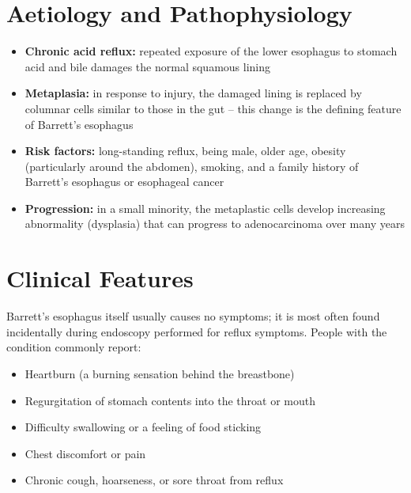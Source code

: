 \section*{Aetiology and Pathophysiology}
\begin{itemize}
    \item \textbf{Chronic acid reflux:} repeated exposure of the lower esophagus to stomach acid and bile damages the normal squamous lining
    \item \textbf{Metaplasia:} in response to injury, the damaged lining is replaced by columnar cells similar to those in the gut -- this change is the defining feature of Barrett's esophagus
    \item \textbf{Risk factors:} long-standing reflux, being male, older age, obesity (particularly around the abdomen), smoking, and a family history of Barrett's esophagus or esophageal cancer
    \item \textbf{Progression:} in a small minority, the metaplastic cells develop increasing abnormality (dysplasia) that can progress to adenocarcinoma over many years
\end{itemize}

\section*{Clinical Features}
Barrett's esophagus itself usually causes no symptoms; it is most often found incidentally during endoscopy performed for reflux symptoms. People with the condition commonly report:

\begin{itemize}
    \item Heartburn (a burning sensation behind the breastbone)
    \item Regurgitation of stomach contents into the throat or mouth
    \item Difficulty swallowing or a feeling of food sticking
    \item Chest discomfort or pain
    \item Chronic cough, hoarseness, or sore throat from reflux
\end{itemize}

